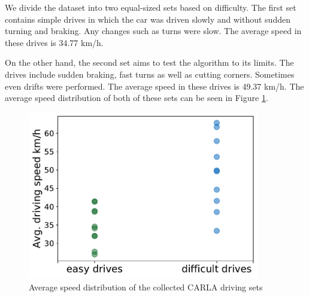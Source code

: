 \documentclass{ctuthesis/ctuthesis}
\begin{document}
We divide the dataset into two equal-sized sets based on difficulty. The first set contains simple drives in which the car was driven slowly and without sudden turning and braking. Any changes such as turns were slow. The average speed in these drives is 34.77 km/h.\par


On the other hand, the second set aims to test the algorithm to its limits. The drives include sudden braking, fast turns as well as cutting corners. Sometimes even drifts were performed. The average speed in these drives is 49.37 km/h. The average speed distribution of both of these sets can be seen in Figure \ref{f:speed_distribution}.


\begin{figure}[]
    \centering
    \includegraphics[width=0.9\textwidth]{images/average_speeds.pdf}
    
    \caption{Average speed distribution of the collected CARLA driving sets}\label{f:speed_distribution}
\end{figure}
\end{document}
